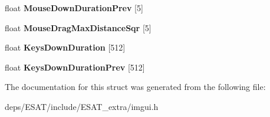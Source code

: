 \begin{DoxyCompactItemize}
\item 
\mbox{\label{struct_im_gui_i_o_a59d19cf7ad831e57ce15f90295871881}} 
float {\bfseries Mouse\+Down\+Duration\+Prev} \mbox{[}5\mbox{]}
\item 
\mbox{\label{struct_im_gui_i_o_a86c7fe77349fd82a60ab7a279aa27f01}} 
float {\bfseries Mouse\+Drag\+Max\+Distance\+Sqr} \mbox{[}5\mbox{]}
\item 
\mbox{\label{struct_im_gui_i_o_a6f1da2ea6d8e3398d9526fe983cf0a6f}} 
float {\bfseries Keys\+Down\+Duration} \mbox{[}512\mbox{]}
\item 
\mbox{\label{struct_im_gui_i_o_ac079dcd415784a08fec74388e18abb97}} 
float {\bfseries Keys\+Down\+Duration\+Prev} \mbox{[}512\mbox{]}
\end{DoxyCompactItemize}


The documentation for this struct was generated from the following file\+:\begin{DoxyCompactItemize}
\item 
deps/\+E\+S\+A\+T/include/\+E\+S\+A\+T\+\_\+extra/imgui.\+h\end{DoxyCompactItemize}
